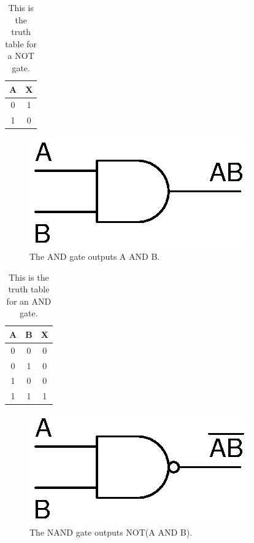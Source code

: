 \begin{table}[!ht]
	\centering
	\begin{tabular}{| c | c |}
		\hline
		A & X \\ 
		\hline
		0 & 1 \\ \hline
		1 & 0 \\ \hline
	\end{tabular}
	\caption{This is the truth table for a NOT gate.}
	\label{table:notgate}
\end{table}

\begin{figure}[!htb]
	\centering
	\includegraphics[scale=0.7]{logic/AND.eps}
	\caption{The AND gate outputs A AND B.}
	\label{fig:andgate}
\end{figure} 

\begin{table}[!ht]
	\centering
	\begin{tabular}{| c | c | c |}
		\hline
		A & B & X \\ 
		\hline
		0 & 0 & 0 \\ \hline
		0 & 1 & 0 \\ \hline
		1 & 0 & 0 \\ \hline
		1 & 1 & 1 \\ \hline
	\end{tabular}
	\caption{This is the truth table for an AND gate.}
	\label{table:andgate}
\end{table}

\begin{figure}[!htb]
	\centering
	\includegraphics[scale=0.7]{logic/NAND.eps}
	\caption{The NAND gate outputs NOT(A AND B).}
	\label{fig:nandgate}
\end{figure} 

